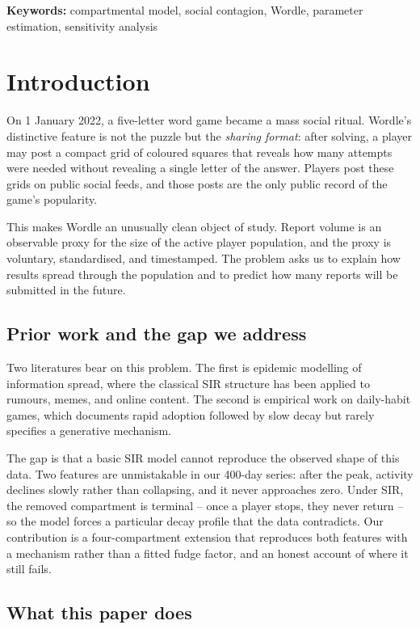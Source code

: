 \documentclass[12pt]{article}
\begin{document}
\vspace{1em}
\noindent\textbf{Keywords:} compartmental model, social contagion, Wordle, parameter estimation, sensitivity analysis

\newpage
\tableofcontents
\newpage
\section{Introduction}\label{sec:SEC-010}
On 1 January 2022, a five-letter word game became a mass social ritual. Wordle's
distinctive feature is not the puzzle but the \emph{sharing format}: after solving,
a player may post a compact grid of coloured squares that reveals how many
attempts were needed without revealing a single letter of the answer. Players
post these grids on public social feeds, and those posts are the only public
record of the game's popularity.

This makes Wordle an unusually clean object of study. Report volume is an
observable proxy for the size of the active player population, and the proxy is
voluntary, standardised, and timestamped. The problem asks us to explain how
results spread through the population and to predict how many reports will be
submitted in the future.

\subsection{Prior work and the gap we address}

Two literatures bear on this problem. The first is epidemic modelling of
information spread, where the classical SIR structure \cite{kermack1927} has
been applied to rumours, memes, and online content. The second is empirical
work on daily-habit games, which documents rapid adoption followed by slow
decay but rarely specifies a generative mechanism.

The gap is that a basic SIR model cannot reproduce the observed shape of this
data. Two features are unmistakable in our 400-day series: after the peak,
activity declines slowly rather than collapsing, and it never approaches zero.
Under SIR, the removed compartment is terminal -- once a player stops, they
never return -- so the model forces a particular decay profile that the data
contradicts. Our contribution is a four-compartment extension that reproduces
both features with a mechanism rather than a fitted fudge factor, and an honest
account of where it still fails.

\subsection{What this paper does}
\end{document}
